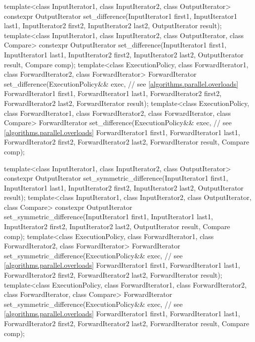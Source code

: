 \begin{codeblock}
{  template<class InputIterator1, class InputIterator2, class OutputIterator>
    constexpr OutputIterator
      set_difference(InputIterator1 first1, InputIterator1 last1,
                     InputIterator2 first2, InputIterator2 last2,
                     OutputIterator result);
  template<class InputIterator1, class InputIterator2, class OutputIterator, class Compare>
    constexpr OutputIterator
      set_difference(InputIterator1 first1, InputIterator1 last1,
                     InputIterator2 first2, InputIterator2 last2,
                     OutputIterator result, Compare comp);
  template<class ExecutionPolicy, class ForwardIterator1, class ForwardIterator2,
           class ForwardIterator>
    ForwardIterator
      set_difference(ExecutionPolicy&& exec, // see \ref{algorithms.parallel.overloads}
                     ForwardIterator1 first1, ForwardIterator1 last1,
                     ForwardIterator2 first2, ForwardIterator2 last2,
                     ForwardIterator result);
  template<class ExecutionPolicy, class ForwardIterator1, class ForwardIterator2,
           class ForwardIterator, class Compare>
    ForwardIterator
      set_difference(ExecutionPolicy&& exec, // see \ref{algorithms.parallel.overloads}
                     ForwardIterator1 first1, ForwardIterator1 last1,
                     ForwardIterator2 first2, ForwardIterator2 last2,
                     ForwardIterator result, Compare comp);

  template<class InputIterator1, class InputIterator2, class OutputIterator>
    constexpr OutputIterator
      set_symmetric_difference(InputIterator1 first1, InputIterator1 last1,
                               InputIterator2 first2, InputIterator2 last2,
                               OutputIterator result);
  template<class InputIterator1, class InputIterator2, class OutputIterator, class Compare>
    constexpr OutputIterator
      set_symmetric_difference(InputIterator1 first1, InputIterator1 last1,
                               InputIterator2 first2, InputIterator2 last2,
                               OutputIterator result, Compare comp);
  template<class ExecutionPolicy, class ForwardIterator1, class ForwardIterator2,
           class ForwardIterator>
    ForwardIterator
      set_symmetric_difference(ExecutionPolicy&& exec, // see \ref{algorithms.parallel.overloads}
                               ForwardIterator1 first1, ForwardIterator1 last1,
                               ForwardIterator2 first2, ForwardIterator2 last2,
                               ForwardIterator result);
  template<class ExecutionPolicy, class ForwardIterator1, class ForwardIterator2,
           class ForwardIterator, class Compare>
    ForwardIterator
      set_symmetric_difference(ExecutionPolicy&& exec, // see \ref{algorithms.parallel.overloads}
                               ForwardIterator1 first1, ForwardIterator1 last1,
                               ForwardIterator2 first2, ForwardIterator2 last2,
                               ForwardIterator result, Compare comp);

}
\end{codeblock}
